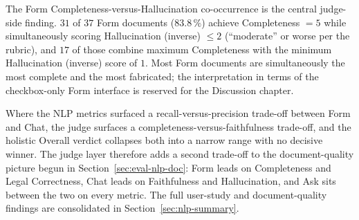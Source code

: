 The Form Completeness-versus-Hallucination co-occurrence is the
central judge-side finding. $31$ of $37$ Form documents
($83.8\,\%$) achieve Completeness $= 5$ while simultaneously
scoring Hallucination (inverse) $\leq 2$ (``moderate'' or worse
per the rubric), and $17$ of those combine maximum Completeness
with the minimum Hallucination (inverse) score of $1$. Most Form
documents are simultaneously the most complete and the most
fabricated; the interpretation in terms of the checkbox-only Form
interface is reserved for the Discussion chapter.

Where the NLP metrics surfaced a recall-versus-precision trade-off
between Form and Chat, the judge surfaces a
completeness-versus-faithfulness trade-off, and the holistic
Overall verdict collapses both into a narrow range with no
decisive winner. The judge layer therefore adds a second trade-off
to the document-quality picture begun in
Section~\ref{sec:eval-nlp-doc}: Form leads on Completeness and
Legal Correctness, Chat leads on Faithfulness and Hallucination,
and Ask sits between the two on every metric. The full user-study
and document-quality findings are consolidated in
Section~\ref{sec:nlp-summary}.
